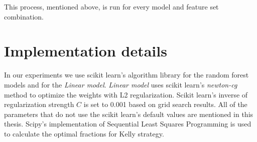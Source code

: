 This process, mentioned above, is run for every model and feature set combination.

\section{Implementation details}
In our experiments we use scikit learn's algorithm library \cite{scipy} for the random forest models and for the \textit{Linear model}. \textit{Linear model} uses scikit learn's \textit{newton-cg} method to optimize the weights with L2 regularization. Scikit learn's inverse of regularization strength $C$ is set to 0.001 based on grid search results. All of the parameters that do not use the scikit learn's default values are mentioned in this thesis. Scipy's implementation of Sequential Least Squares Programming is used to calculate the optimal fractions for Kelly strategy.